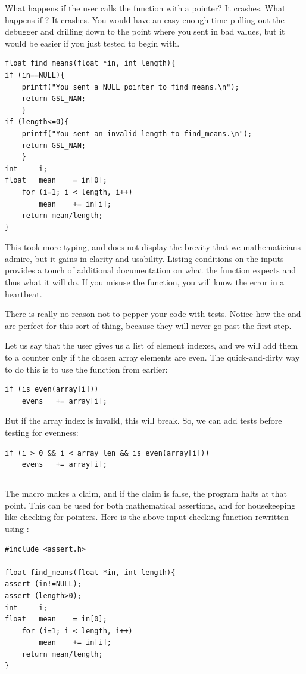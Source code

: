\documentclass[12pt]{article}
\makeatletter
\def\cindex#1{\index{#1@\cinline{#1}}}
\makeatother
\begin{document}
What happens if the user calls the function with a 
pointer? It crashes. What happens if ? It crashes.
You would have an easy enough time pulling out the debugger and drilling
down to the point where you sent in bad values, but it would be easier
if you just tested to begin with.
\begin{lstlisting}
float find_means(float *in, int length){
if (in==NULL){
    printf("You sent a NULL pointer to find_means.\n");
    return GSL_NAN;
    }
if (length<=0){
    printf("You sent an invalid length to find_means.\n");
    return GSL_NAN;
    }
int     i;
float   mean    = in[0];
    for (i=1; i < length, i++)
        mean    += in[i];
    return mean/length;
}
\end{lstlisting}
This took more typing, and does not display the brevity that we
mathematicians admire, but it gains in clarity and usability. Listing
conditions on the inputs provides a touch of additional documentation on
what the function expects and thus what it will do. If you misuse the
function, you will know the error in a heartbeat.

There is really no reason not to pepper your code with tests. Notice how
the \cinline{\&\&} and \cinline{||} are perfect for this sort of thing,
because they will never go past the first step. 

Let us say that the user gives us a list of element indexes, and we will
add them to a counter only if the chosen array elements are even. The
quick-and-dirty way to do this is to use the  function
from earlier:
\begin{lstlisting}
if (is_even(array[i]))
    evens   += array[i];
\end{lstlisting}
But if the array index is invalid, this will break. So, we can add tests
before testing for evenness:
\begin{lstlisting}
if (i > 0 && i < array_len && is_even(array[i]))
    evens   += array[i];
\end{lstlisting}

\subsection{} \cindex{assert}
The  macro makes a claim, and if the claim is false, the
program halts at that point. This can be used for both mathematical
assertions, and for housekeeping like checking for 
pointers. Here is the above input-checking function rewritten using
:
\begin{lstlisting}
#include <assert.h>

float find_means(float *in, int length){
assert (in!=NULL);
assert (length>0);
int     i;
float   mean    = in[0];
    for (i=1; i < length, i++)
        mean    += in[i];
    return mean/length;
}
\end{lstlisting}
\end{document}
